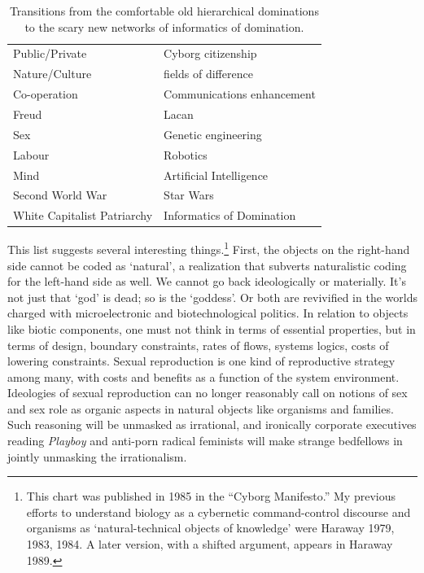 \documentclass[DIV=12,%
               BCOR=10mm,%
               headinclude=false,%
               footinclude=false,open=any,%
               fontsize=11pt,%
               twoside,%
               paper=210mm:11in]%
               {scrbook}
\newcommand*{\Slash}{\slash\hspace{0pt}}
\begin{document}
\begin{table}[htbp!]
\begin{minipage}[t]{\textwidth}
\begin{tabularx}{\textwidth}{|X|X|}
\relax  Public\Slash{}Private   &  Cyborg citizenship  \\
\relax  Nature\Slash{}Culture   &  fields of difference  \\
\relax  Co-operation   &  Communications enhancement  \\
\relax  Freud   &  Lacan  \\
\relax  Sex   &  Genetic engineering  \\
\relax  Labour   &  Robotics  \\
\relax  Mind   &  Artificial Intelligence  \\
\relax  Second World War   &  Star Wars  \\
\relax  White Capitalist Patriarchy   &  Informatics of Domination  \\
\hline
\end{tabularx}

\caption[]{Transitions from the comfortable old hierarchical dominations to the scary new networks of informatics of domination.}
\end{minipage}
\end{table}


This list suggests several interesting things.\footnote{This chart was published in 1985 in the “Cyborg Manifesto.” My previous efforts to understand biology as a cybernetic command-control discourse and organisms as ‘natural-technical objects of knowledge’ were Haraway 1979, 1983, 1984. A later version, with a shifted argument, appears in Haraway 1989.} First, the objects on the right-hand side cannot be coded as ‘natural’, a realization that subverts naturalistic coding for the left-hand side as well. We cannot go back ideologically or materially. It’s not just that ‘god’ is dead; so is the ‘goddess’. Or both are revivified in the worlds charged with microelectronic and biotechnological politics. In relation to objects like biotic components, one must not think in terms of essential properties, but in terms of design, boundary constraints, rates of flows, systems logics, costs of lowering constraints. Sexual reproduction is one kind of reproductive strategy among many, with costs and benefits as a function of the system environment. Ideologies of sexual reproduction can no longer reasonably call on notions of sex and sex role as organic aspects in natural objects like organisms and families. Such reasoning will be unmasked as irrational, and ironically corporate executives reading \emph{Playboy} and anti-porn radical feminists will make strange bedfellows in jointly unmasking the irrationalism.
\end{document}
